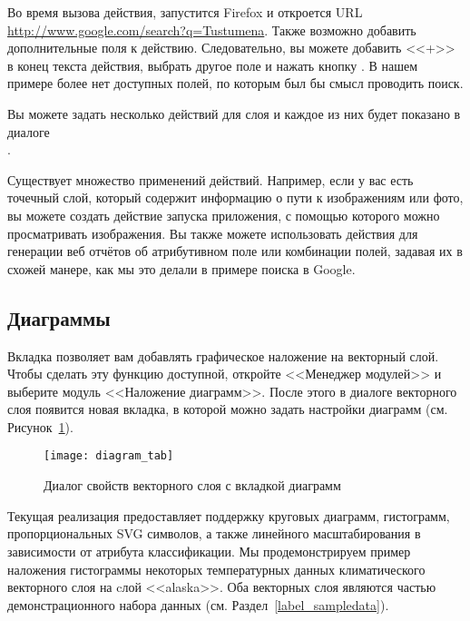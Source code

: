 Во время вызова действия, запустится Firefox и откроется URL
\url{http://www.google.com/search?q=Tustumena}. Также возможно добавить
дополнительные поля к действию. Следовательно, вы можете добавить <<+>>
в конец текста действия, выбрать другое поле и нажать кнопку
. В нашем примере более нет доступных полей, по которым
был бы смысл проводить поиск.

Вы можете задать несколько действий для слоя и каждое из них будет показано в
диалоге \\
.

Существует множество применений действий. Например, если у вас есть точечный
слой, который содержит информацию о пути к изображениям или фото, вы можете
создать действие запуска приложения, с помощью которого можно просматривать
изображения. Вы также можете использовать действия для генерации веб отчётов
об атрибутивном поле или комбинации полей, задавая их в схожей манере, как
мы это делали в примере поиска в Google.

\subsection{Диаграммы}\label{sec:diagram}

Вкладка  позволяет вам добавлять графическое наложение на
векторный слой. Чтобы сделать эту функцию доступной, откройте <<Менеджер модулей>>
и выберите модуль <<Наложение диаграмм>>. После этого в диалоге 
векторного слоя появится новая вкладка, в которой можно задать настройки диаграмм
(см. Рисунок~\ref{fig:diagramtab}).

\begin{figure}[ht]
   \centering
   \texttt{[image: diagram\_tab]}
   \caption{Диалог свойств векторного слоя с вкладкой диаграмм \wincaption}\label{fig:diagramtab}
\end{figure}

Текущая реализация предоставляет поддержку круговых диаграмм, гистограмм,
пропорциональных SVG символов, а также линейного масштабирования в зависимости
от атрибута классификации. Мы продемонстрируем пример наложения гистограммы
некоторых температурных данных климатического векторного слоя на cлой <<alaska>>.
Оба векторных слоя являются частью демонстрационного набора данных \qg
(см. Раздел~\ref{label_sampledata}).

